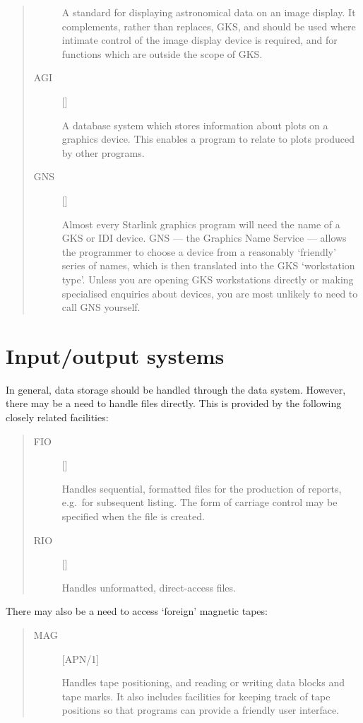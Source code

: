 \begin{quote}
\begin{description}
 A standard for displaying astronomical data on an image display.
 It complements, rather than replaces, GKS, and should be used where intimate
 control of the image display device is required, and for functions which
 are outside the scope of GKS.

\item [AGI] \hfill []

 A database system which stores information about plots on a graphics device.
 This enables a program to relate to plots produced by other programs.

\item [GNS] \hfill []

 Almost every Starlink graphics program will need the name of a GKS or IDI
 device.
 GNS --- the Graphics Name Service --- allows the programmer to choose a device
 from a reasonably `friendly' series of names, which is then translated into the
 GKS `workstation type'.
 Unless you are opening GKS workstations directly or making specialised
 enquiries about devices, you are most unlikely to need to call GNS yourself.

\end{description}
\end{quote}

\section{Input/output systems}

In general, data storage should be handled through the data system.
However, there may be a need to handle files directly.
This is provided by the following closely related facilities:
\begin{quote}
\begin{description}

\item [FIO] \hfill []

 Handles sequential, formatted files for the production of reports, e.g.\ for
 subsequent listing.
 The form of carriage control may be specified when the file is created.

\item [RIO] \hfill []

 Handles unformatted, direct-access files.

\end{description}
\end{quote}
There may also be a need to access `foreign' magnetic tapes:
\begin{quote}
\begin{description}

\item [MAG] \hfill [APN/1]

 Handles tape positioning, and reading or writing data blocks and tape marks.
 It also includes facilities for keeping track of tape positions so that
 programs can provide a friendly user interface.

\end{description}
\end{quote}

